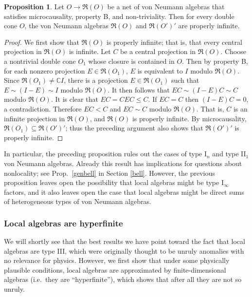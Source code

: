 \documentclass[12pt]{article}
\newcommand{\alg}[1]{\mathfrak{#1}}
\theoremstyle{definition}
\newtheorem{prop}[thm]{Proposition}
\theoremstyle{definition}
\theoremstyle{remark}
\def\7#1{{\mathbb #1}}
\begin{document}
\begin{prop} Let $O\to \alg{R}(O)$ be a net of von Neumann algebras that satisfies
  microcausality, property B, and non-triviality.  Then for every double cone $O$, the
  von Neumann algebras $\alg{R}(O)$ and $\alg{R}(O')'$ are properly infinite.
  \label{infinite}
\end{prop}

\begin{proof} We first show that $\alg{R}(O)$ is
  properly infinite; that is, that every central
  projection in $\alg{R}(O)$ is infinite.  Let $C$ be a
  central projection in $\alg{R}(O)$.  Choose a
  nontrivial double cone $O_1$ whose closure is
  contained in $O$.  Then by property B, for each
  nonzero projection $E\in \alg{R}(O_1)$, $E$ is
  equivalent to $I$ modulo $\alg{R}(O)$.  Since
  $\alg{R}(O_1)\neq \7C I$, there is a projection $E\in
  \alg{R}(O_1)$ such that $E\sim (I-E)\sim I$ modulo
  $\alg{R}(O)$.  It then follows that $EC\sim
  (I-E)C\sim C$ modulo $\alg{R}(O)$.  It is clear that
  $EC=CEC\leq C$.  If $EC=C$ then $(I-E)C=0$, a
  contradiction.  Therefore $EC<C$ and $EC\sim C$
  modulo $\alg{R}(O)$.  That is, $C$ is an infinite
  projection in $\alg{R}(O)$, and $\alg{R}(O)$ is
  properly infinite.  By microcausality,
  $\alg{R}(O_1)\subseteq \alg{R}(O')'$; thus the
  preceding argument also shows that $\alg{R}(O')'$ is
  properly infinite.
\end{proof}

In particular, the preceding proposition rules out the cases of type I$_n$ and type
II$_1$ von Neumann algebras.  Already this result has implications for questions
about nonlocality; see Prop.\ \ref{genbell} in Section \ref{bell}.  However, the
previous proposition leaves open the possibility that local algebras might be type
I$_\infty$ factors, and it also leaves open the case that local algebras might be
direct sums of heterogeneous types of von Neumann algebras.

\subsubsection{Local algebras are hyperfinite}

We will shortly see that the best results we have point toward the fact that local
algebras are type III, which were originally thought to be unruly anomalies with no
relevance for physics.  However, we first show that under some physically plausible
conditions, local algebras are approximated by finite-dimensional algebras (i.e.\
they are ``hyperfinite''), which shows that after all they are not so unruly.
\end{document}
